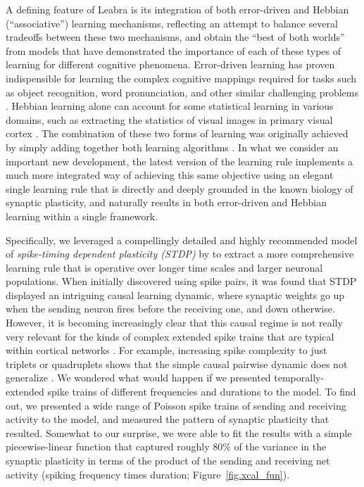 \documentclass[11pt,twoside]{article}
\begin{document}
A defining feature of Leabra is its integration of both error-driven and
Hebbian (``associative'') learning mechanisms, reflecting an attempt to
balance several tradeoffs between these two mechanisms, and obtain the ``best
of both worlds'' from models that have demonstrated the importance of each of
these types of learning for different cognitive phenomena.  Error-driven
learning has proven indispensible for learning the complex cognitive mappings
required for tasks such as object recognition, word pronunciation, and other
similar challenging problems \cite{OReilly96,OReilly98,OReillyMunakata00}.  Hebbian
learning alone can account for some statistical learning in various domains,
such as extracting the statistics of visual images in primary visual cortex
\cite{OlshausenField96,OlshausenField97}.  The combination of these two forms
of learning was originally achieved by simply adding together both learning
algorithms \cite{OReillyMunakata00}.  In what we consider an important new
development, the latest version of the learning rule implements a much more
integrated way of achieving this same objective using an elegant single
learning rule that is directly and deeply grounded in the known biology of
synaptic plasticity, and naturally results in both error-driven and Hebbian
learning within a single framework.

Specifically, we leveraged a compellingly detailed and highly recommended
model of {\em spike-timing dependent plasticity (STDP)} by
 to extract a more comprehensive learning
rule that is operative over longer time scales and larger neuronal
populations. When initially discovered using spike pairs, it was found that
STDP displayed an intriguing causal learning dynamic, where synaptic weights
go up when the sending neuron fires before the receiving one, and down
otherwise. However, it is becoming increasingly clear that this causal regime
is not really very relevant for the kinds of complex extended spike trains
that are typical within cortical networks
\cite{FroemkeDan02,RubinGerkinBiEtAl05,ShouvalWangWittenberg10,WangGerkinNauenEtAl05}.
For example, increasing spike complexity to just triplets or quadruplets shows
that the simple causal pairwise dynamic does not generalize
\cite{FroemkeDan02,RubinGerkinBiEtAl05,WangGerkinNauenEtAl05}.  We wondered
what would happen if we presented temporally-extended spike trains of
different frequencies and durations to the 
model.  To find out, we presented a wide range of Poisson spike trains of
sending and receiving activity to the model, and measured the pattern of
synaptic plasticity that resulted.  Somewhat to our surprise, we were able to
fit the results with a simple piecewise-linear function that captured roughly
80\% of the variance in the synaptic plasticity in terms of the product of the
sending and receiving net activity (spiking frequency times duration;
Figure~\ref{fig.xcal_fun}).
\end{document}
